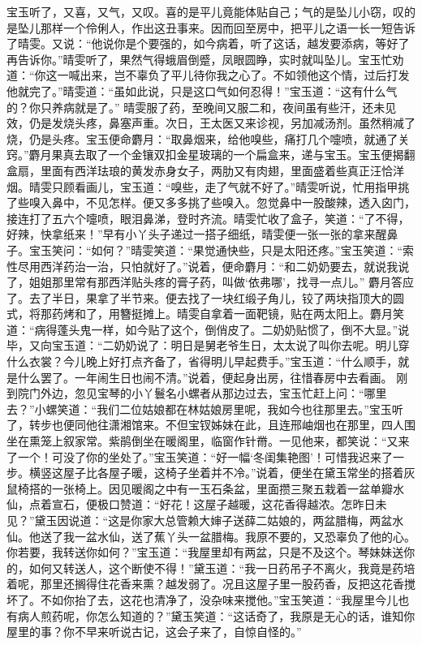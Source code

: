 \documentclass[12pt,oneside]{book}
\begin{document}
宝玉听了，又喜，又气，又叹。喜的是平儿竟能体贴自己；气的是坠儿小窃，叹的是坠儿那样一个伶俐人，作出这丑事来。因而回至房中，把平儿之语一长一短告诉了晴雯。又说：“他说你是个要强的，如今病着，听了这话，越发要添病，等好了再告诉你。”晴雯听了，果然气得蛾眉倒蹙，凤眼圆睁，实时就叫坠儿。宝玉忙劝道：“你这一喊出来，岂不辜负了平儿待你我之心了。不如领他这个情，过后打发他就完了。”晴雯道：“虽如此说，只是这口气如何忍得！”宝玉道：“这有什么气的？你只养病就是了。”
晴雯服了药，至晚间又服二和，夜间虽有些汗，还未见效，仍是发烧头疼，鼻塞声重。次日，王太医又来诊视，另加减汤剂。虽然稍减了烧，仍是头疼。宝玉便命麝月：“取鼻烟来，给他嗅些，痛打几个嚏喷，就通了关窍。”麝月果真去取了一个金镶双扣金星玻璃的一个扁盒来，递与宝玉。宝玉便揭翻盒扇，里面有西洋珐琅的黄发赤身女子，两肋又有肉翅，里面盛着些真正汪恰洋烟。晴雯只顾看画儿，宝玉道：“嗅些，走了气就不好了。”晴雯听说，忙用指甲挑了些嗅入鼻中，不见怎样。便又多多挑了些嗅入。忽觉鼻中一股酸辣，透入囟门，接连打了五六个嚏喷，眼泪鼻涕，登时齐流。晴雯忙收了盒子，笑道：“了不得，好辣，快拿纸来！”早有小丫头子递过一搭子细纸，晴雯便一张一张的拿来醒鼻子。宝玉笑问：“如何？”晴雯笑道：“果觉通快些，只是太阳还疼。”宝玉笑道：“索性尽用西洋药治一治，只怕就好了。”说着，便命麝月：“和二奶奶要去，就说我说了，姐姐那里常有那西洋贴头疼的膏子药，叫做‘依弗哪’，找寻一点儿。”
麝月答应了。去了半日，果拿了半节来。便去找了一块红缎子角儿，铰了两块指顶大的圆式，将那药烤和了，用簪挺摊上。晴雯自拿着一面靶镜，贴在两太阳上。麝月笑道：“病得蓬头鬼一样，如今贴了这个，倒俏皮了。二奶奶贴惯了，倒不大显。”说毕，又向宝玉道：“二奶奶说了：明日是舅老爷生日，太太说了叫你去呢。明儿穿什么衣裳？今儿晚上好打点齐备了，省得明儿早起费手。”宝玉道：“什么顺手，就是什么罢了。一年闹生日也闹不清。”说着，便起身出房，往惜春房中去看画。
刚到院门外边，忽见宝琴的小丫鬟名小螺者从那边过去，宝玉忙赶上问：“哪里去？”小螺笑道：“我们二位姑娘都在林姑娘房里呢，我如今也往那里去。”宝玉听了，转步也便同他往潇湘馆来。不但宝钗姊妹在此，且连邢岫烟也在那里，四人围坐在熏笼上叙家常。紫鹃倒坐在暖阁里，临窗作针黹。一见他来，都笑说：“又来了一个！可没了你的坐处了。”宝玉笑道：“好一幅‘冬闺集艳图’！可惜我迟来了一步。横竖这屋子比各屋子暖，这椅子坐着并不冷。”说着，便坐在黛玉常坐的搭着灰鼠椅搭的一张椅上。因见暖阁之中有一玉石条盆，里面攒三聚五栽着一盆单瓣水仙，点着宣石，便极口赞道：“好花！这屋子越暖，这花香得越浓。怎昨日未见？”黛玉因说道：“这是你家大总管赖大婶子送薛二姑娘的，两盆腊梅，两盆水仙。他送了我一盆水仙，送了蕉丫头一盆腊梅。我原不要的，又恐辜负了他的心。你若要，我转送你如何？”宝玉道：“我屋里却有两盆，只是不及这个。琴妹妹送你的，如何又转送人，这个断使不得！”黛玉道：“我一日药吊子不离火，我竟是药培着呢，那里还搁得住花香来熏？越发弱了。况且这屋子里一股药香，反把这花香搅坏了。不如你抬了去，这花也清净了，没杂味来搅他。”宝玉笑道：“我屋里今儿也有病人煎药呢，你怎么知道的？”黛玉笑道：“这话奇了，我原是无心的话，谁知你屋里的事？你不早来听说古记，这会子来了，自惊自怪的。”
\end{document}
